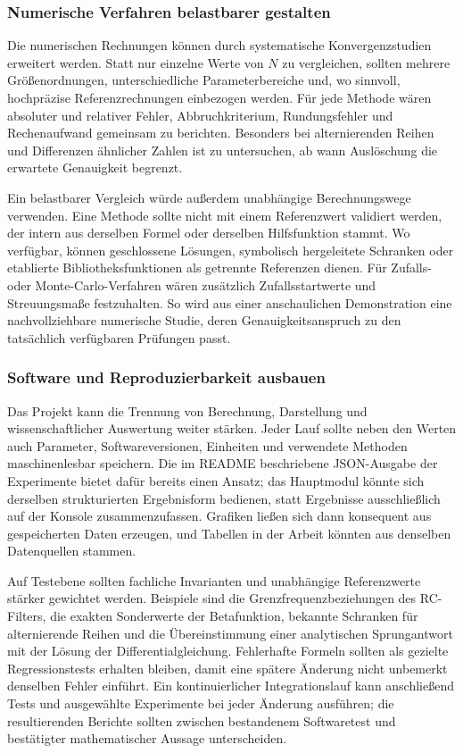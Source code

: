 \documentclass[a4paper,12pt,twoside]{report}
\theoremstyle{definition}
\begin{document}
\subsubsection{Numerische Verfahren belastbarer gestalten}

Die numerischen Rechnungen können durch systematische Konvergenzstudien erweitert werden. Statt nur einzelne Werte von $N$ zu vergleichen, sollten mehrere Größenordnungen, unterschiedliche Parameterbereiche und, wo sinnvoll, hochpräzise Referenzrechnungen einbezogen werden. Für jede Methode wären absoluter und relativer Fehler, Abbruchkriterium, Rundungsfehler und Rechenaufwand gemeinsam zu berichten. Besonders bei alternierenden Reihen und Differenzen ähnlicher Zahlen ist zu untersuchen, ab wann Auslöschung die erwartete Genauigkeit begrenzt.

Ein belastbarer Vergleich würde außerdem unabhängige Berechnungswege verwenden. Eine Methode sollte nicht mit einem Referenzwert validiert werden, der intern aus derselben Formel oder derselben Hilfsfunktion stammt. Wo verfügbar, können geschlossene Lösungen, symbolisch hergeleitete Schranken oder etablierte Bibliotheksfunktionen als getrennte Referenzen dienen. Für Zufalls- oder Monte-Carlo-Verfahren wären zusätzlich Zufallsstartwerte und Streuungsmaße festzuhalten. So wird aus einer anschaulichen Demonstration eine nachvollziehbare numerische Studie, deren Genauigkeitsanspruch zu den tatsächlich verfügbaren Prüfungen passt.

\subsubsection{Software und Reproduzierbarkeit ausbauen}

Das Projekt kann die Trennung von Berechnung, Darstellung und wissenschaftlicher Auswertung weiter stärken. Jeder Lauf sollte neben den Werten auch Parameter, Softwareversionen, Einheiten und verwendete Methoden maschinenlesbar speichern. Die im README beschriebene JSON-Ausgabe der Experimente bietet dafür bereits einen Ansatz; das Hauptmodul könnte sich derselben strukturierten Ergebnisform bedienen, statt Ergebnisse ausschließlich auf der Konsole zusammenzufassen. Grafiken ließen sich dann konsequent aus gespeicherten Daten erzeugen, und Tabellen in der Arbeit könnten aus denselben Datenquellen stammen.

Auf Testebene sollten fachliche Invarianten und unabhängige Referenzwerte stärker gewichtet werden. Beispiele sind die Grenzfrequenzbeziehungen des RC-Filters, die exakten Sonderwerte der Betafunktion, bekannte Schranken für alternierende Reihen und die Übereinstimmung einer analytischen Sprungantwort mit der Lösung der Differentialgleichung. Fehlerhafte Formeln sollten als gezielte Regressionstests erhalten bleiben, damit eine spätere Änderung nicht unbemerkt denselben Fehler einführt. Ein kontinuierlicher Integrationslauf kann anschließend Tests und ausgewählte Experimente bei jeder Änderung ausführen; die resultierenden Berichte sollten zwischen bestandenem Softwaretest und bestätigter mathematischer Aussage unterscheiden.
\end{document}
